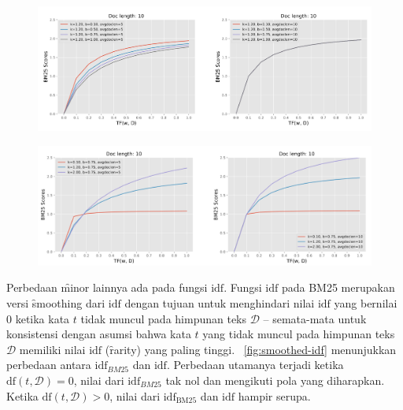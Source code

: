     \begin{figure}
        \centering
        \includegraphics[width=1\textwidth]{assets/pics/effect-bm25-param-b.png}
        \label{fig:effect-bm25-param-b}
    \end{figure}
    \begin{figure}
        \centering
        \includegraphics[width=1\textwidth]{assets/pics/effect-bm25-param-k.png}
        \label{fig:effect-bm25-param-k}
    \end{figure}
    
    Perbedaan \f{minor} lainnya ada pada fungsi $\text{idf}$. Fungsi $\text{idf}$ pada BM25 merupakan versi \f{smoothing} dari $\text{idf}$ dengan tujuan untuk menghindari nilai $\text{idf}$ yang bernilai 0 ketika kata $t$ tidak muncul pada himpunan teks $\mathcal{D}$ -- semata-mata untuk konsistensi dengan asumsi bahwa kata $t$ yang tidak muncul pada himpunan teks $\mathcal{D}$ memiliki nilai $\text{idf}$ (\f{rarity}) yang paling tinggi. \pic~\ref{fig:smoothed-idf} menunjukkan perbedaan antara $\text{idf}_{BM25}$ dan $\text{idf}$. Perbedaan utamanya terjadi ketika $\text{df}(t,\mathcal{D}) = 0$, nilai dari  $\text{idf}_{BM25}$ tak nol dan mengikuti pola yang diharapkan. Ketika $\text{df}(t,\mathcal{D})>0$, nilai dari $\text{idf}_{\text{BM25}}$ dan $\text{idf}$ hampir serupa.

